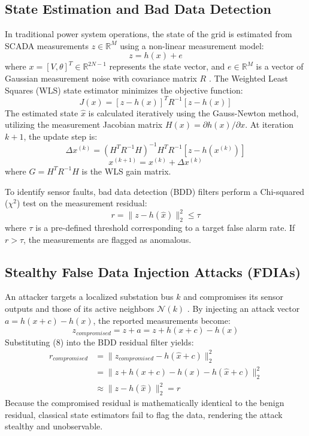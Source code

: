 \documentclass[journal]{IEEEtran}
\begin{document}
\subsection{State Estimation and Bad Data Detection}
In traditional power system operations, the state of the grid is estimated from SCADA measurements $z \in \mathbb{R}^M$ using a non-linear measurement model:
\begin{equation}
z = h(x) + e
\end{equation}
where $x = [V, \theta]^T \in \mathbb{R}^{2N-1}$ represents the state vector, and $e \in \mathbb{R}^M$ is a vector of Gaussian measurement noise with covariance matrix $R$ \cite{b5}. The Weighted Least Squares (WLS) state estimator minimizes the objective function:
\begin{equation}
J(x) = [z - h(x)]^T R^{-1} [z - h(x)]
\end{equation}
The estimated state $\hat{x}$ is calculated iteratively using the Gauss-Newton method, utilizing the measurement Jacobian matrix $H(x) = \partial h(x) / \partial x$. At iteration $k+1$, the update step is:
\begin{equation}
\Delta x^{(k)} = \left( H^T R^{-1} H \right)^{-1} H^T R^{-1} [z - h(x^{(k)})]
\end{equation}
\begin{equation}
x^{(k+1)} = x^{(k)} + \Delta x^{(k)}
\end{equation}
where $G = H^T R^{-1} H$ is the WLS gain matrix.

To identify sensor faults, bad data detection (BDD) filters perform a Chi-squared ($\chi^2$) test on the measurement residual:
\begin{equation}
r = \|z - h(\hat{x})\|_2^2 \le \tau
\end{equation}
where $\tau$ is a pre-defined threshold corresponding to a target false alarm rate. If $r > \tau$, the measurements are flagged as anomalous.

\subsection{Stealthy False Data Injection Attacks (FDIAs)}
An attacker targets a localized substation bus $k$ and compromises its sensor outputs and those of its active neighbors $\mathcal{N}(k)$ \cite{b11}. By injecting an attack vector $a = h(x+c) - h(x)$, the reported measurements become:
\begin{equation}
z_{compromised} = z + a = z + h(x + c) - h(x)
\end{equation}
Substituting (8) into the BDD residual filter yields:
\begin{align}
r_{compromised} &= \|z_{compromised} - h(\hat{x} + c)\|_2^2 \nonumber \\
&= \|z + h(x+c) - h(x) - h(\hat{x}+c)\|_2^2 \nonumber \\
&\approx \|z - h(\hat{x})\|_2^2 = r
\end{align}
Because the compromised residual is mathematically identical to the benign residual, classical state estimators fail to flag the data, rendering the attack stealthy and unobservable.
\end{document}
